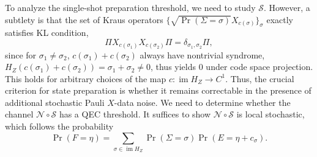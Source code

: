 \documentclass[twoside,english,aps,showpacs,pra,superscriptaddress]{revtex4-2}
\DeclareMathOperator{\im}{im}
\begin{document}
To analyze the single-shot preparation threshold, we need to study $\mathcal{S}$. However, a subtlety is that the set of Kraus operators $\{\sqrt{\Pr(\Sigma = \sigma)} X_{c(\sigma)} \}_{\sigma}$ exactly satisfies KL condition, 
\begin{equation}
    \Pi X_{c(\sigma_1)} X_{c(\sigma_2)} \Pi = \delta_{\sigma_1,\sigma_2} \Pi,
\end{equation}
since for $\sigma_1 \neq \sigma_2$, $c(\sigma_1)+c(\sigma_2)$ always have nontrivial syndrome, $H_Z(c(\sigma_1)+c(\sigma_2) ) = \sigma_1+\sigma_2 \neq 0$, thus yields $0$ under code space projection. This holds for arbitrary choices of the map $c: \im H_Z \rightarrow C^1$. Thus, the crucial criterion for state preparation is whether it remains correctable in the presence of additional stochastic Pauli $ X$-data noise. We need to determine whether the channel $\mathcal{N} \circ \mathcal{S}$ has a QEC threshold. It suffices to show $\mathcal{N} \circ \mathcal{S}$ is local stochastic, which follows the probability
\begin{equation}
    \Pr(F=\eta) = \sum_{\sigma \in \im H_Z } \Pr(\Sigma = \sigma) \Pr(E = \eta + c_{\sigma}).
\end{equation}
\end{document}
